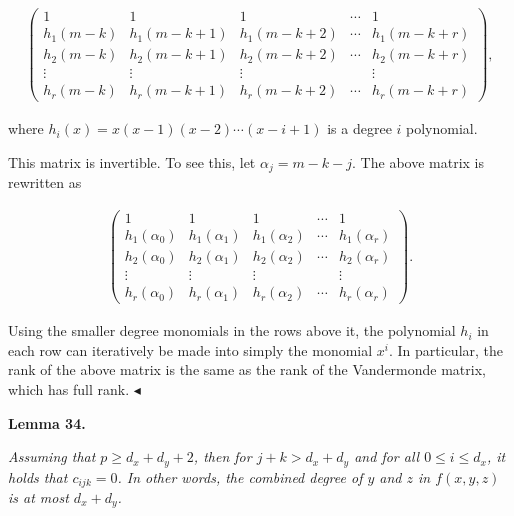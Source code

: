 \[\begin{gathered}
\begin{pmatrix}1&1&1&\cdots&1\\
h_{1}(m-k)&h_{1}(m-k+1)&h_{1}(m-k+2)&\cdots&h_{1}(m-k+r)\\
h_{2}(m-k)&h_{2}(m-k+1)&h_{2}(m-k+2)&\cdots&h_{2}(m-k+r)\\
\vdots&\vdots&\vdots&&\vdots\\
h_{r}(m-k)&h_{r}(m-k+1)&h_{r}(m-k+2)&\cdots&h_{r}(m-k+r)\end{pmatrix},
\end{gathered}\]


where $h_{i}(x)=x(x-1)(x-2)\cdots(x-i+1)$ is a degree $i$ polynomial.\par




This matrix is invertible. To see this, let $\alpha_{j}=m-k-j$. The above matrix is rewritten as\par


\[\begin{gathered}
\begin{pmatrix}1&1&1&\cdots&1\\
h_{1}(\alpha_{0})&h_{1}(\alpha_{1})&h_{1}(\alpha_{2})&\cdots&h_{1}(\alpha_{r})\\
h_{2}(\alpha_{0})&h_{2}(\alpha_{1})&h_{2}(\alpha_{2})&\cdots&h_{2}(\alpha_{r})\\
\vdots&\vdots&\vdots&&\vdots\\
h_{r}(\alpha_{0})&h_{r}(\alpha_{1})&h_{r}(\alpha_{2})&\cdots&h_{r}(\alpha_{r})\end{pmatrix}.
\end{gathered}\]


Using the smaller degree monomials in the rows above it, the polynomial $h_{i}$ in each row can iteratively be made into simply the monomial $x^{i}$. In particular, the rank of the above matrix is the same as the rank of the Vandermonde matrix, which has full rank.
$\blacktriangleleft$\par





\par\medskip\noindent\textbf{
\textbf{Lemma 34}\textbf{.}
}\par



\emph{Assuming that $p\geq d_{x}+d_{y}+2$, then for $j+k>d_{x}+d_{y}$ and for all $0\leq i\leq d_{x}$, it holds that $c_{ijk}=0$. In other words, the combined degree of $y$ and $z$ in $f(x,y,z)$ is at most $d_{x}+d_{y}$.}\par



